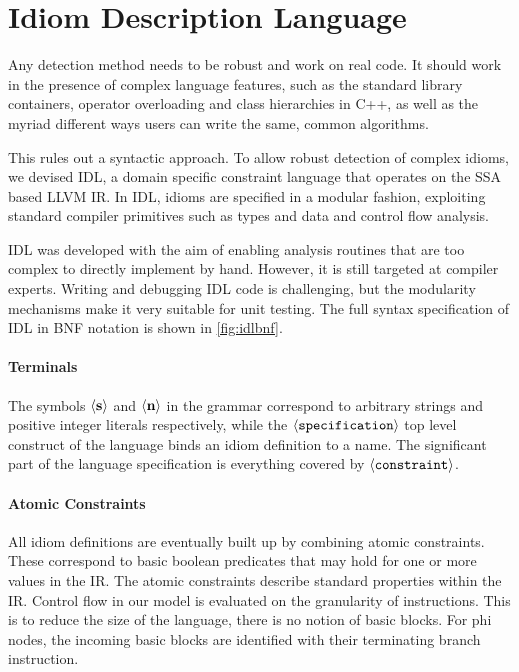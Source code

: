 \section{Idiom Description Language}
\label{sec:idl}

\begin{figure}[t]
    
    \label{fig:idlbnf}
\end{figure}

    Any detection method needs to be robust and work on real code.
    It should work in the presence of complex language features, such as the
    standard library containers, operator overloading and class hierarchies in
    C++, as well as the myriad different ways users can write the same, common
    algorithms.

    This rules out a syntactic approach.
    To allow robust detection of complex idioms, we devised IDL, a domain
    specific constraint language that operates on the SSA based LLVM IR.
    In IDL, idioms are specified in a modular fashion, exploiting standard
    compiler primitives such as types and data and control flow analysis.

    IDL was developed with the aim of enabling analysis routines that are too
    complex to directly implement by hand.
    However, it is still targeted at compiler experts.
    Writing and debugging IDL code is challenging, but the modularity mechanisms
    make it very suitable for unit testing.
    The full syntax specification of IDL in BNF notation is shown in
    \autoref{fig:idlbnf}.

    \paragraph{Terminals}
    The symbols $\left<\text{\bf s}\right>$ and $\left<\text{\bf n}\right>$ in
    the grammar correspond to arbitrary strings and positive integer literals
    respectively, while  the $\left<\text{\tt specification}\right>$ top level
    construct of the language binds an idiom definition to a name.
    The significant  part of the language specification is everything covered by
    $\left<\text{\tt constraint}\right>$.

    \paragraph{Atomic Constraints}
    All idiom definitions are eventually built up by combining atomic
    constraints.
    These correspond to basic boolean predicates that may hold for one or more
    values in the IR.
    The atomic constraints describe standard properties within the IR.
    Control flow in our model is evaluated on the granularity of instructions.
    This is to reduce the size of the language, there is no notion of basic
    blocks.
    For phi nodes, the incoming basic blocks are identified with their
    terminating branch instruction.

